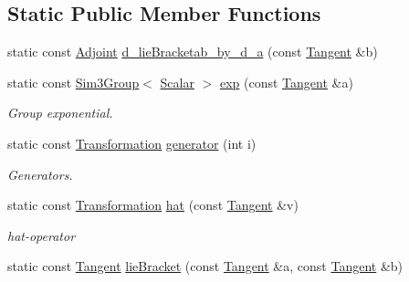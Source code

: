 \subsection*{Static Public Member Functions}
\begin{DoxyCompactItemize}
\item 
static const \hyperlink{class_sophus_1_1_sim3_group_base_a7aa93f325ac7b811db77652f488e8f03}{Adjoint} \hyperlink{class_sophus_1_1_sim3_group_base_a75d815e06f09b40f27f19cb8d91e4b11}{d\+\_\+lie\+Bracketab\+\_\+by\+\_\+d\+\_\+a} (const \hyperlink{class_sophus_1_1_sim3_group_base_a0f61582b6d8fa46ecbb40d70c87b632c}{Tangent} \&b)
\item 
static const \hyperlink{class_sophus_1_1_sim3_group}{Sim3\+Group}$<$ \hyperlink{class_sophus_1_1_sim3_group_base_abcf3d57b9fcc425bbc367a85a45a8092}{Scalar} $>$ \hyperlink{class_sophus_1_1_sim3_group_base_ac39ec02a41087c306c333e7104def94c}{exp} (const \hyperlink{class_sophus_1_1_sim3_group_base_a0f61582b6d8fa46ecbb40d70c87b632c}{Tangent} \&a)
\begin{DoxyCompactList}\small\item\em Group exponential. \end{DoxyCompactList}\item 
static const \hyperlink{class_sophus_1_1_sim3_group_base_a93c8c564e3386709dc4cb2fc6d451dd8}{Transformation} \hyperlink{class_sophus_1_1_sim3_group_base_a69f3e5315c09c13a1776c8cdde52bd99}{generator} (int i)
\begin{DoxyCompactList}\small\item\em Generators. \end{DoxyCompactList}\item 
static const \hyperlink{class_sophus_1_1_sim3_group_base_a93c8c564e3386709dc4cb2fc6d451dd8}{Transformation} \hyperlink{class_sophus_1_1_sim3_group_base_a4260919b9987a953c96f1e363e36550b}{hat} (const \hyperlink{class_sophus_1_1_sim3_group_base_a0f61582b6d8fa46ecbb40d70c87b632c}{Tangent} \&v)
\begin{DoxyCompactList}\small\item\em hat-\/operator \end{DoxyCompactList}\item 
static const \hyperlink{class_sophus_1_1_sim3_group_base_a0f61582b6d8fa46ecbb40d70c87b632c}{Tangent} \hyperlink{class_sophus_1_1_sim3_group_base_a2d00f2fe3d14bef278f9e858bec68b0b}{lie\+Bracket} (const \hyperlink{class_sophus_1_1_sim3_group_base_a0f61582b6d8fa46ecbb40d70c87b632c}{Tangent} \&a, const \hyperlink{class_sophus_1_1_sim3_group_base_a0f61582b6d8fa46ecbb40d70c87b632c}{Tangent} \&b)

\end{DoxyCompactItemize}
